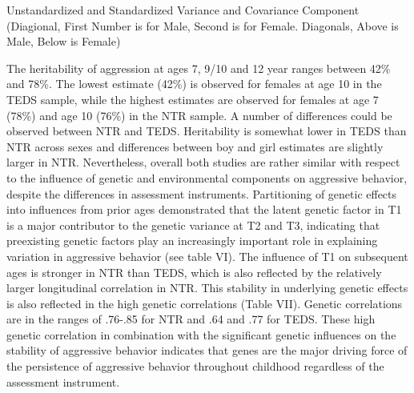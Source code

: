 \begin{table}
  \caption{Unstandardized and Standardized Variance and Covariance Component (Diagional,
    First Number is for Male, Second is for Female.
    Diagonals, Above is Male, Below is Female)}\label{tab:var_components}
\end{table}
The heritability of aggression at ages 7, 9/10 and 12 year ranges between 42\% and 78\%.  The lowest estimate (42\%) is observed for females at age 10 in the TEDS sample, while the highest estimates are observed for females at age 7 (78\%) and age 10 (76\%) in the NTR sample.
A number of differences could be observed between NTR and TEDS.
Heritability is somewhat lower in TEDS than NTR across sexes and differences between boy and girl estimates are slightly larger in NTR.
Nevertheless, overall both studies are rather similar with respect to the influence of genetic and environmental components on aggressive behavior, despite the differences in assessment instruments.
Partitioning of genetic effects into influences from prior ages demonstrated that the latent genetic factor in T1 is a major contributor to the genetic variance at T2 and T3, indicating that preexisting genetic factors play an increasingly important role in explaining variation in aggressive behavior (see table VI).
The influence of T1 on subsequent ages is stronger in NTR than TEDS, which is also reflected by the relatively larger longitudinal correlation in NTR.
This stability in underlying genetic effects is also reflected in the high genetic correlations (Table VII).
Genetic correlations are in the ranges of .76-.85 for NTR and .64 and .77 for TEDS.
These high genetic correlation in combination with the significant genetic influences on the stability of aggressive behavior indicates that genes are the major driving force of the persistence of aggressive behavior throughout childhood regardless of the assessment instrument. 
